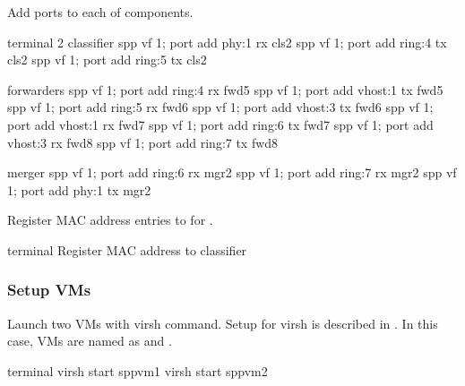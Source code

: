 \documentclass[a4paper,11pt,openany,oneside,english]{sphinxmanual}
\begin{document}
Add ports to each of components.

\begin{sphinxVerbatim}[commandchars=\\\{\},formatcom=\footnotesize]
\PYGZsh{} terminal 2
\PYGZsh{} classifier
spp \PYGZgt{} vf 1; port add phy:1 rx cls2
spp \PYGZgt{} vf 1; port add ring:4 tx cls2
spp \PYGZgt{} vf 1; port add ring:5 tx cls2

\PYGZsh{} forwarders
spp \PYGZgt{} vf 1; port add ring:4 rx fwd5
spp \PYGZgt{} vf 1; port add vhost:1 tx fwd5
spp \PYGZgt{} vf 1; port add ring:5 rx fwd6
spp \PYGZgt{} vf 1; port add vhost:3 tx fwd6
spp \PYGZgt{} vf 1; port add vhost:1 rx fwd7
spp \PYGZgt{} vf 1; port add ring:6 tx fwd7
spp \PYGZgt{} vf 1; port add vhost:3 rx fwd8
spp \PYGZgt{} vf 1; port add ring:7 tx fwd8

\PYGZsh{} merger
spp \PYGZgt{} vf 1; port add ring:6 rx mgr2
spp \PYGZgt{} vf 1; port add ring:7 rx mgr2
spp \PYGZgt{} vf 1; port add phy:1 tx mgr2
\end{sphinxVerbatim}

Register MAC address entries to  for .

\begin{sphinxVerbatim}[commandchars=\\\{\},formatcom=\footnotesize]
 terminal 
 Register MAC address to classifier
\end{sphinxVerbatim}


\subsubsection{Setup VMs}
\label{\detokenize{usecases/spp_vf:setup-vms}}\label{\detokenize{usecases/spp_vf:spp-usecases-vf-ssh-setup-vms}}
Launch two VMs with virsh command.
Setup for virsh is described in {\hyperref[\detokenize{gsg/howto_use:spp-gsg-howto-virsh}]{}}.
In this case, VMs are named as  and .

\begin{sphinxVerbatim}[commandchars=\\\{\},formatcom=\footnotesize]
 terminal 
 virsh start spp\PYGZhy{}vm1  
 virsh start spp\PYGZhy{}vm2  
\end{sphinxVerbatim}
\end{document}
